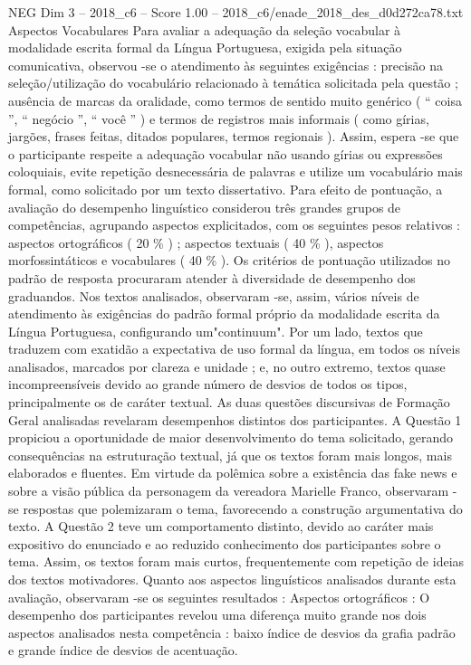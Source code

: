 \begin{textsample}{NEG Dim 3 – 2018\_c6 – Score 1.00 – 2018\_c6/enade\_2018\_des\_d0d272ca78.txt}
Aspectos Vocabulares Para avaliar a adequação da seleção vocabular à modalidade escrita formal da Língua Portuguesa, exigida pela situação comunicativa, observou -se o atendimento às seguintes exigências : precisão na seleção/utilização do vocabulário relacionado à temática solicitada pela questão ; ausência de marcas da oralidade, como termos de sentido muito genérico ( “ coisa ”, “ negócio ”, “ você ” ) e termos de registros mais informais ( como gírias, jargões, frases feitas, ditados populares, termos regionais ).
Assim, espera -se que o participante respeite a adequação vocabular não usando gírias ou expressões coloquiais, evite repetição desnecessária de palavras e utilize um vocabulário mais formal, como solicitado por um texto dissertativo.
Para efeito de pontuação, a avaliação do desempenho linguístico considerou três grandes grupos de competências, agrupando aspectos explicitados, com os seguintes pesos relativos : aspectos ortográficos ( 20 \% ) ; aspectos textuais ( 40 \% ), aspectos morfossintáticos e vocabulares ( 40 \% ).
Os critérios de pontuação utilizados no padrão de resposta procuraram atender à diversidade de desempenho dos graduandos.
Nos textos analisados, observaram -se, assim, vários níveis de atendimento às exigências do padrão formal próprio da modalidade escrita da Língua Portuguesa, configurando um"continuum".
Por um lado, textos que traduzem com exatidão a expectativa de uso formal da língua, em todos os níveis analisados, marcados por clareza e unidade ; e, no outro extremo, textos quase incompreensíveis devido ao grande número de desvios de todos os tipos, principalmente os de caráter textual.
As duas questões discursivas de Formação Geral analisadas revelaram desempenhos distintos dos participantes.
A Questão 1 propiciou a oportunidade de maior desenvolvimento do tema solicitado, gerando consequências na estruturação textual, já que os textos foram mais longos, mais elaborados e fluentes.
Em virtude da polêmica sobre a existência das fake news e sobre a visão pública da personagem da vereadora Marielle Franco, observaram -se respostas que polemizaram o tema, favorecendo a construção argumentativa do texto.
A Questão 2 teve um comportamento distinto, devido ao caráter mais expositivo do enunciado e ao reduzido conhecimento dos participantes sobre o tema.
Assim, os textos foram mais curtos, frequentemente com repetição de ideias dos textos motivadores.
Quanto aos aspectos linguísticos analisados durante esta avaliação, observaram -se os seguintes resultados : Aspectos ortográficos : O desempenho dos participantes revelou uma diferença muito grande nos dois aspectos analisados nesta competência : baixo índice de desvios da grafia padrão e grande índice de desvios de acentuação.

\end{textsample}
